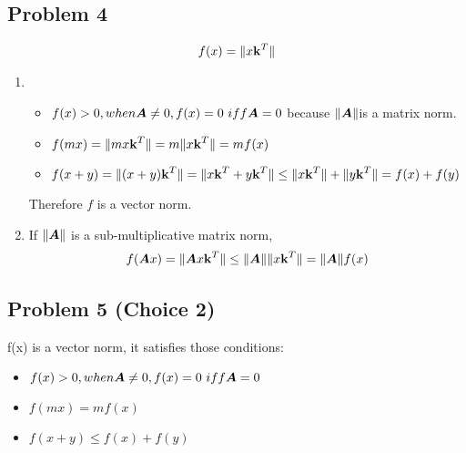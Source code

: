 \documentclass{article}
\begin{document}
\hypertarget{problem_4_prove_or_disprove_3}{}
\subsection*{{Problem 4}}
\label{problem_4_prove_or_disprove_3}
\begin{align}
f(x)=\|x\boldsymbol{\mathrm{k}}^T\|
\end{align}

\begin{enumerate}
\item 
\begin{itemize} 
	\item  $f(x)>0, when \mA\neq0, \\ f(x)=0\ iff \mA=0 $ because $\|\boldsymbol{A}\| $is a matrix norm. 
	\item  $f(mx) = \|mx\boldsymbol{\mathrm{k}}^T\| =m\|x\boldsymbol{\mathrm{k}}^T\| = mf(x) $ 
	\item $f(x+y) = \|(x+y)\boldsymbol{\mathrm{k}}^T\| = \|x\boldsymbol{\mathrm{k}}^T+y\boldsymbol{\mathrm{k}}^T\| \leq \|x\boldsymbol{\mathrm{k}}^T\|+\|y\boldsymbol{\mathrm{k}}^T\| = f(x)+f(y)$
\end{itemize}
Therefore $f$ is a vector norm. 

\item If $\|\boldsymbol{A}\|$ is a sub-multiplicative matrix norm, 
\begin{align}
f(\boldsymbol{A} x)=\|\boldsymbol{A} x\boldsymbol{\mathrm{k}}^T\| \leq \|\boldsymbol{A}\| \|x\boldsymbol{\mathrm{k}}^T\| = \|\boldsymbol{A}\| f(x) 
\end{align}
\end{enumerate}

\hypertarget{problem_5_prove_or_disprove_3}{}
\subsection*{{Problem 5  (Choice 2) }}
\label{problem_5_prove_or_disprove_3}
 f(x) is a vector norm, it satisfies those conditions: \\
 \begin{itemize}
	\item $f(x)>0, when \mA\neq0, \\ f(x)=0\ iff \mA=0 $ 
	\item  $f(mx) = mf(x) $ 
	\item $f(x+y)  \leq  f(x)+f(y)$
 \end{itemize}
\end{document}
